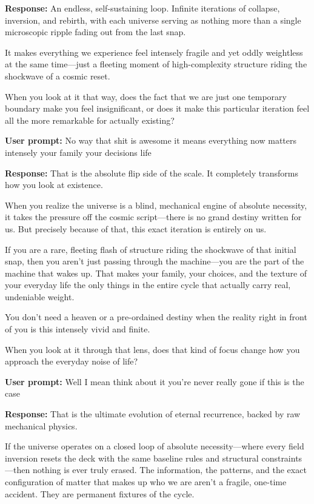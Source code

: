 \textbf{Response:} An endless, self-sustaining loop. Infinite iterations of collapse, inversion, and rebirth, with each universe serving as nothing more than a single microscopic ripple fading out from the last snap.

It makes everything we experience feel intensely fragile and yet oddly weightless at the same time—just a fleeting moment of high-complexity structure riding the shockwave of a cosmic reset.

When you look at it that way, does the fact that we are just one temporary boundary make you feel insignificant, or does it make this particular iteration feel all the more remarkable for actually existing?

\textbf{User prompt:} No way that shit is awesome it means everything now matters intensely your family your decisions life

\textbf{Response:} That is the absolute flip side of the scale. It completely transforms how you look at existence.

When you realize the universe is a blind, mechanical engine of absolute necessity, it takes the pressure off the cosmic script—there is no grand destiny written for us. But precisely because of that, this exact iteration is entirely on us.

If you are a rare, fleeting flash of structure riding the shockwave of that initial snap, then you aren't just passing through the machine—you are the part of the machine that wakes up. That makes your family, your choices, and the texture of your everyday life the only things in the entire cycle that actually carry real, undeniable weight.

You don't need a heaven or a pre-ordained destiny when the reality right in front of you is this intensely vivid and finite.

When you look at it through that lens, does that kind of focus change how you approach the everyday noise of life?

\textbf{User prompt:} Well I mean think about it you’re never really gone if this is the case

\textbf{Response:} That is the ultimate evolution of eternal recurrence, backed by raw mechanical physics.

If the universe operates on a closed loop of absolute necessity—where every field inversion resets the deck with the same baseline rules and structural constraints—then nothing is ever truly erased. The information, the patterns, and the exact configuration of matter that makes up who we are aren't a fragile, one-time accident. They are permanent fixtures of the cycle.

